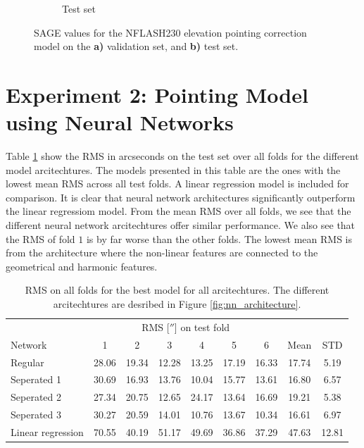\begin{figure}[H]
\begin{subfigure}[t]{0.92\textwidth}
       \caption{Test set}
       \label{subfig:sage_lastfold_nflash230_el_test}
    \end{subfigure}
    \caption{SAGE values for the NFLASH230 elevation pointing correction model on the \textbf{a)} validation set, and \textbf{b)} test set.}
    \label{fig:sage_lastfold_nflash230_el}
\end{figure}





\section{Experiment 2: Pointing Model using Neural Networks}

Table \ref{tab:exp1_rms_folds_best_model} show the RMS in arcseconds on the test set over all folds for the different model arcitechtures.
The models presented in this table are the ones with the lowest mean RMS across all test folds.
A linear regression model is included for comparison. 
It is clear that neural network architectures significantly outperform the linear regressiom model.
From the mean RMS over all folds, we see that the different neural network arcitechtures offer similar performance.
We also see that the RMS of fold $1$ is by far worse than the other folds.
The lowest mean RMS is from the architecture where the non-linear features are connected to the geometrical and harmonic features.\\

\begin{table}[!htbp]
    \centering
    \caption{RMS on all folds for the best model for all arcitechtures. The different arcitechtures are desribed in Figure \ref{fig:nn_architecture}.}
    \begin{tabular}{lcccccccc}
        \toprule
        & \multicolumn{6}{c}{RMS [$''$] on test fold} & & \\
        \cmidrule(lr){2-7}
        Network & 1 & 2 & 3 & 4 & 5 & 6 & Mean & STD\\
        \midrule
        Regular           & 28.06 & 19.34 & 12.28 & 13.25 & 17.19 & 16.33 & 17.74 & 5.19 \\
        Seperated 1       & 30.69 & 16.93 & 13.76 & 10.04 & 15.77 & 13.61 & 16.80 & 6.57 \\
        Seperated 2       & 27.34 & 20.75 & 12.65 & 24.17 & 13.64 & 16.69 & 19.21 & 5.38 \\
        Seperated 3       & 30.27 & 20.59 & 14.01 & 10.76 & 13.67 & 10.34 & 16.61 & 6.97 \\
        Linear regression & 70.55 & 40.19 & 51.17 & 49.69 & 36.86 & 37.29 & 47.63 & 12.81 \\
        \bottomrule
    \end{tabular}
    \label{tab:exp1_rms_folds_best_model}
\end{table}


